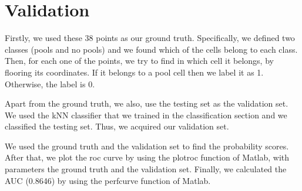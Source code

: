 \documentclass[a4paper,12pt]{article}
\begin{document}
\section*{Validation}
Firstly, we used these 38 points as our ground truth. Specifically, we defined two classes (pools and no pools) and we found which of the cells belong to each class. Then, for each one of the points, we try to find in which cell it belongs, by flooring its coordinates. If it belongs to a pool cell then we label it as 1. Otherwise, the label is 0. 
\par Apart from the ground truth, we also, use the testing set as the validation set. We used the kNN classifier that we trained in the classification section and we classified the testing set. Thus, we acquired our validation set. 
\par We used the ground truth and the validation set to find the probability scores. After that, we plot the roc curve by using the plotroc function of Matlab, with parameters the ground truth and the validation set. Finally, we calculated the AUC (0.8646) by using the perfcurve function of Matlab. 
\end{document}
